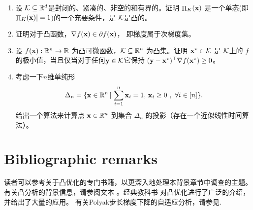 \begin{enumerate}
\begin{enumerate}
\end{enumerate}



\item
设 $\mathcal K\subseteq{\mathbb R}^d$是封闭的、紧凑的、非空的和有界的。证明 $\mathop{\Pi}_K(\mathbf x)$ 是一个单态(即 $\mathop{\Pi}_K(\mathbf x)|=1$)的一个充要条件，是 $\mathcal K$是凸的。


\item
证明对于凸函数，$\nabla f(\mathbf x)\in\partial f(\mathbf x)$， 即梯度属于次梯度集。

\item
 设 $f(\mathbf x): \mathbb{R}^n\rightarrow\mathbb{R}$ 为凸可微函数，$\mathcal K\subseteq\mathbb{R}^n$ 为凸集。证明 $\mathbf x^\star\in\mathcal K$ 是 $\mathcal K$上的 $f$的极小值，当且仅当对于任何$\mathbf y\in\mathcal K$它保持 $(\mathbf y-\mathbf x^\star)^{\top}\nabla f(\mathbf x^\star)\geq 0$。

\item
考虑一下$n$维单纯形
$$\Delta_n = \lbrace{\ensuremath{\mathbf x}\in\mathbb{R}^n \, | \, \sum_{i=1}^n \ensuremath{\mathbf x}_i = 1, \, \ensuremath{\mathbf x}_i \geq 0 \ ,  \ \forall{i\in[n]}}\rbrace .$$
给出一个算法来计算点 $\mathbf x\in\mathbb{R}^n$ 到集合 $\Delta_n$ 的投影（存在一个近似线性时间算法）。

\end{enumerate}





\newpage
\section{Bibliographic remarks}


读者可以参考关于凸优化的专门书籍，以更深入地处理本背景章节中调查的主题。有关凸分析的背景信息，请参阅文本 \cite{borwein2006convex,rockafellar1997convex}。经典教科书 \cite{boyd.convex}对凸优化进行了广泛的介绍，并给出了大量的应用。
有关Polyak步长梯度下降的自适应分析，请参见\cite{hazan2019revisiting}.